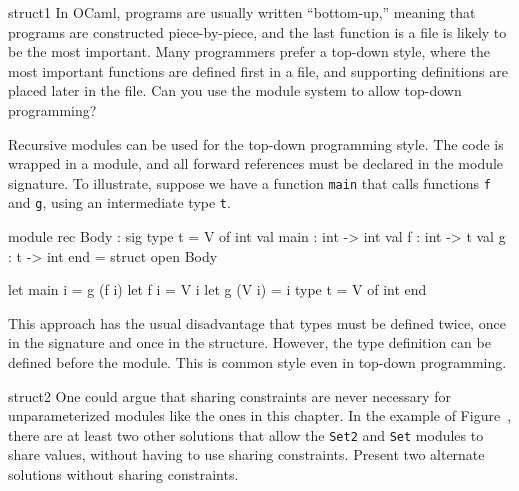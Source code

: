 %
%
\begin{exercise}{struct1}
In OCaml, programs are usually written ``bottom-up,'' meaning that
programs are constructed piece-by-piece, and the last function is a
file is likely to be the most important.  Many programmers prefer a
top-down style, where the most important functions are defined first
in a file, and supporting definitions are placed later in the file.
Can you use the module system to allow top-down programming?

\begin{answer}\ifanswers
Recursive modules can be used for the top-down programming style.  The
code is wrapped in a module, and all forward references must be
declared in the module signature.  To illustrate, suppose we have a
function \hbox{\lstinline$main$} that calls
functions \hbox{\lstinline$f$} and \hbox{\lstinline$g$}, using an
intermediate type \hbox{\lstinline$t$}.

\begin{ocaml}
module rec Body : sig
   type t = V of int
   val main : int -> int
   val f : int -> t
   val g : t -> int
end = struct
   open Body

   let main i = g (f i)
   let f i = V i
   let g (V i) = i
   type t = V of int
end
\end{ocaml}
%
This approach has the usual disadvantage that types must be defined
twice, once in the signature and once in the structure.  However, the
type definition can be defined before the module.  This is common
style even in top-down programming.
\fi\end{answer}
\end{exercise}

% 
%
\begin{exercise}{struct2}
One could argue that sharing constraints are never necessary for
unparameterized modules like the ones in this chapter. In the example
of Figure~, there are at least two other solutions
that allow the \hbox{\lstinline/Set2/} and \hbox{\lstinline/Set/}
modules to share values, without having to use sharing
constraints. Present two alternate solutions without sharing
constraints.
\end{exercise}

